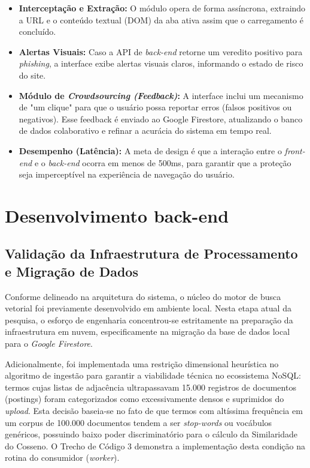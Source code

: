 \documentclass[a4paper,12pt]{article}
\begin{document}
\begin{itemize}
\item \textbf{Interceptação e Extração:} O módulo opera de forma assíncrona, extraindo a URL e o conteúdo textual (DOM) da aba ativa assim que o carregamento é concluído.
\item \textbf{Alertas Visuais:} Caso a API de \textit{back-end} retorne um veredito positivo para \textit{phishing}, a interface exibe alertas visuais claros, informando o estado de risco do site.
\item \textbf{Módulo de \textit{Crowdsourcing (Feedback)}:} A interface inclui um mecanismo de "um clique" para que o usuário possa reportar erros (falsos positivos ou negativos). Esse feedback é enviado ao Google Firestore, atualizando o banco de dados colaborativo e refinar a acurácia do sistema em tempo real.
\item \textbf{Desempenho (Latência):} A meta de design é que a interação entre o \textit{front-end} e o \textit{back-end} ocorra em menos de 500ms, para garantir que a proteção seja imperceptível na experiência de navegação do usuário.
\end{itemize}

\section{Desenvolvimento back-end}
\label{sec:dev_bknd}

\subsection{Validação da Infraestrutura de Processamento e Migração de Dados}

Conforme delineado na arquitetura do sistema, o núcleo do motor de busca vetorial foi previamente desenvolvido em ambiente local. Nesta etapa atual da pesquisa, o esforço de engenharia concentrou-se estritamente na preparação da infraestrutura em nuvem, especificamente na migração da base de dados local para o \textit{Google Firestore}.

Adicionalmente, foi implementada uma restrição dimensional heurística no algoritmo de ingestão para garantir a viabilidade técnica no ecossistema NoSQL: termos cujas listas de adjacência ultrapassavam 15.000 registros de documentos (postings) foram categorizados como excessivamente densos e suprimidos do \textit{upload}. Esta decisão baseia-se no fato de que termos com altíssima frequência em um corpus de 100.000 documentos tendem a ser \textit{stop-words} ou vocábulos genéricos, possuindo baixo poder discriminatório para o cálculo da Similaridade do Cosseno. O Trecho de Código 3 demonstra a implementação desta condição na rotina do consumidor (\textit{worker}).
\end{document}
